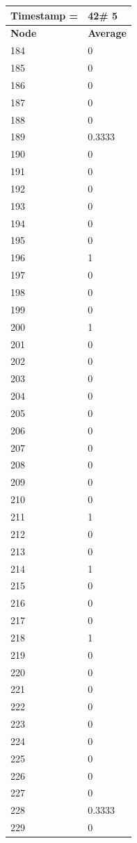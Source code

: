 \begin{tabular}{|l||l|}
\hline
\textbf{Timestamp =} & \textbf{42}\# 5\\\hline
	\textbf{Node} & \textbf{Average} \\ \hline
\hline
	184 & 0 \\ \hline
	185 & 0 \\ \hline
	186 & 0 \\ \hline
	187 & 0 \\ \hline
	188 & 0 \\ \hline
	189 & 0.3333 \\ \hline
	190 & 0 \\ \hline
	191 & 0 \\ \hline
	192 & 0 \\ \hline
	193 & 0 \\ \hline
	194 & 0 \\ \hline
	195 & 0 \\ \hline
	196 & 1 \\ \hline
	197 & 0 \\ \hline
	198 & 0 \\ \hline
	199 & 0 \\ \hline
	200 & 1 \\ \hline
	201 & 0 \\ \hline
	202 & 0 \\ \hline
	203 & 0 \\ \hline
	204 & 0 \\ \hline
	205 & 0 \\ \hline
	206 & 0 \\ \hline
	207 & 0 \\ \hline
	208 & 0 \\ \hline
	209 & 0 \\ \hline
	210 & 0 \\ \hline
	211 & 1 \\ \hline
	212 & 0 \\ \hline
	213 & 0 \\ \hline
	214 & 1 \\ \hline
	215 & 0 \\ \hline
	216 & 0 \\ \hline
	217 & 0 \\ \hline
	218 & 1 \\ \hline
	219 & 0 \\ \hline
	220 & 0 \\ \hline
	221 & 0 \\ \hline
	222 & 0 \\ \hline
	223 & 0 \\ \hline
	224 & 0 \\ \hline
	225 & 0 \\ \hline
	226 & 0 \\ \hline
	227 & 0 \\ \hline
	228 & 0.3333 \\ \hline
	229 & 0 \\ \hline
\end{tabular}
